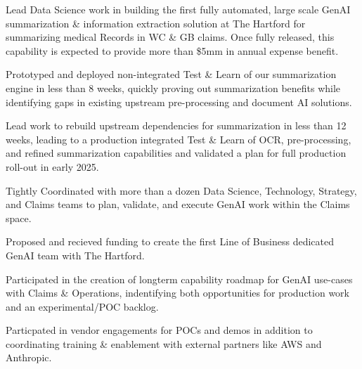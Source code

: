\documentclass[letterpaper]{deedy-resume} %
\begin{document}
\begin{minipage}[t]{0.68\textwidth}
  \hfill
  \vspace{\topsep}
  \begin{tightitemize}
    \item Lead Data Science work in building the first fully automated, large scale GenAI summarization \&
      information extraction solution at The Hartford for summarizing medical Records in WC \& GB claims.  
      Once fully released, this capability is expected to provide more than \$5mm in annual expense benefit.
    \item Prototyped and deployed non-integrated Test \& Learn of our summarization
      engine in less than 8 weeks, quickly proving out summarization benefits while
      identifying gaps in existing upstream pre-processing and document AI solutions.
    \item Lead work to rebuild upstream dependencies for summarization in less than 12 weeks, 
      leading to a production integrated Test \& Learn of OCR, pre-processing, and refined
      summarization capabilities and validated a plan for full production roll-out in early 2025.
    \item Tightly Coordinated with more than a dozen Data Science, Technology, Strategy, and Claims teams
      to plan, validate, and execute GenAI work within the Claims space.
    \item Proposed and recieved funding to create the first Line of Business dedicated
      GenAI team with The Hartford.
    \item Participated in the creation of longterm capability roadmap for GenAI 
      use-cases with Claims \& Operations, indentifying both opportunities for production 
      work and an experimental/POC backlog.
    \item Particpated in vendor engagements for POCs and demos in addition to coordinating
      training \& enablement with external partners like AWS and Anthropic.
  \end{tightitemize}
  \sectionspace
  

\end{minipage}
\end{document}
